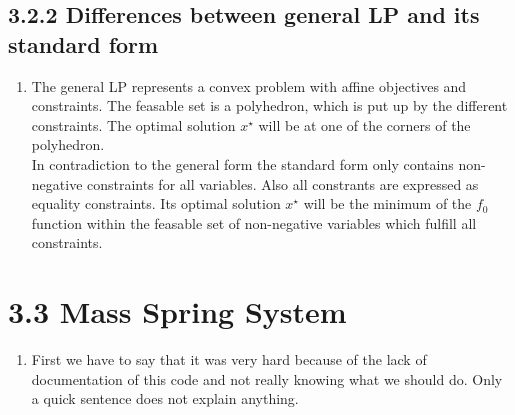 \documentclass{report}
\begin{document}
	\subsection*{3.2.2 Differences between general LP and its standard form}
	\begin{enumerate}[]
		\item The general LP represents a convex problem with affine objectives and constraints. The feasable set is a polyhedron, which is put up by the different constraints. The optimal solution $x^{\star}$ will be at one of the corners of the polyhedron. \\
		In contradiction to the general form the standard form only contains non-negative constraints for all variables. Also all constrants are expressed as equality constraints. Its optimal solution $x^{\star}$ will be the minimum of the $f_0$ function within the feasable set of non-negative variables which fulfill all constraints.
	\end{enumerate}
	\section*{3.3 Mass Spring System}
	\begin{enumerate}[]
		\item First we have to say that it was very hard because of the lack of documentation of this code and not really knowing what we should do. Only a quick sentence does not explain anything.
	\end{enumerate}
\end{document}
